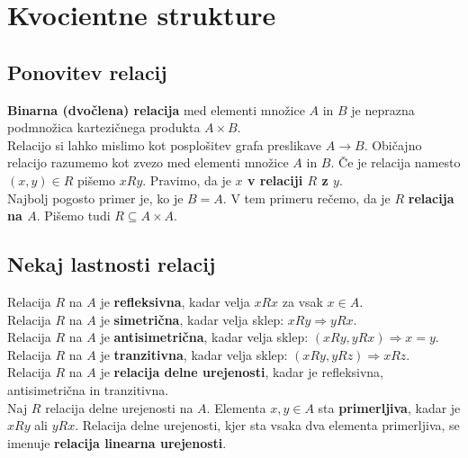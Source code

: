 \documentclass[a4paper,12pt]{article}
\begin{document}
\newpage

\section{Kvocientne strukture}

\subsection{Ponovitev relacij}

\textbf{Binarna (dvočlena) relacija} med elementi množice $A$ in $B$ je neprazna podmnožica kartezičnega produkta $A\times B$.\\

Relacijo si lahko mislimo kot posplošitev grafa preslikave $A\to B$. Običajno relacijo razumemo kot zvezo med elementi množice $A$ in $B$. Če je relacija namesto $(x,y)\in R$ pišemo $xRy$. Pravimo, da je \textbf{$x$ v relaciji $R$ z $y$}. \\

Najbolj pogosto primer je, ko je $B=A$. V tem primeru rečemo, da je $R$ \textbf{relacija na $A$}. Pišemo tudi $R\subseteq A\times A$. \\

\subsection{Nekaj lastnosti relacij}

Relacija $R$ na $A$ je \textbf{refleksivna}, kadar velja $xRx$ za vsak $x\in A$. \\

Relacija $R$ na $A$ je \textbf{simetrična}, kadar velja sklep: $xRy\Rightarrow yRx$. \\

Relacija $R$ na $A$ je \textbf{antisimetrična}, kadar velja sklep: $(xRy,yRx)\Rightarrow x=y$.\\

Relacija $R$ na $A$ je \textbf{tranzitivna}, kadar velja sklep: $(xRy,yRz)\Rightarrow xRz$.\\

Relacija $R$ na $A$ je \textbf{relacija delne urejenosti}, kadar je refleksivna, antisimetrična in tranzitivna.\\

Naj $R$ relacija delne urejenosti na $A$. Elementa $x,y\in A$ sta \textbf{primerljiva}, kadar je $xRy$ ali $yRx$. Relacija delne urejenosti, kjer sta vsaka dva elementa primerljiva, se imenuje \textbf{relacija linearna urejenosti}. \\
\end{document}
